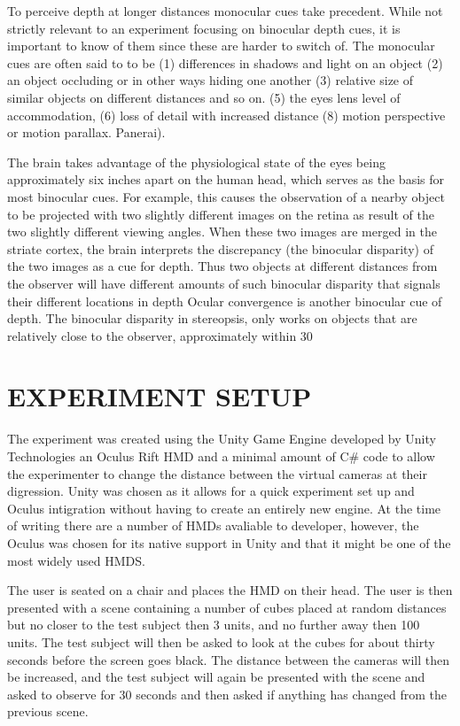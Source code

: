 \documentclass[tog]{acmsiggraph}
\begin{document}
To perceive depth at longer distances monocular cues take precedent. While not strictly relevant to an experiment focusing on binocular depth cues, it is important to know of them since these are harder to switch of. The monocular cues are often said to to be (1) differences in shadows and light on an object (2) an object occluding or in other ways hiding one another (3) relative size of similar objects on different distances and so on. (5) the eyes lens level of accommodation, (6) loss of detail with increased distance (8) motion perspective or motion parallax.
Panerai).

The brain takes advantage of the physiological state of the eyes being approximately six inches
apart on the human head, which serves as the basis for most binocular cues. For example, this
causes the observation of a nearby object to be projected with two slightly different images on the retina as result of the two slightly different viewing angles. When these two images are merged in the striate cortex, the brain interprets the discrepancy (the binocular disparity) of the two images as a cue for depth. Thus two objects at different distances from the observer will have different amounts of such binocular disparity that signals their different locations in depth 
Ocular convergence is another binocular cue of depth. The binocular disparity in stereopsis, only works on objects that are relatively close to the observer,
approximately within 30 



\section{EXPERIMENT SETUP}

The experiment was created using the Unity Game Engine developed by Unity Technologies an Oculus Rift HMD and a minimal amount of C\# code to allow the experimenter to change the distance between the virtual cameras at their digression. Unity was chosen as it allows for a quick experiment set up and Oculus intigration without having to create an entirely new engine.
At the time of writing there are a number of HMDs avaliable to developer, however, the Oculus was chosen for its native support in Unity and that it might be one of the most widely used HMDS.

The user is seated on a chair and places the HMD on their head. The user is then presented with a scene containing a number of cubes placed at random distances but no closer to the test subject then 3 units, and no further away then 100 units. The test subject will then be asked to look at the cubes for about thirty seconds before the screen goes black. The distance between the cameras will then be increased, and the test subject will again be presented with the scene and asked to observe for 30 seconds and then asked if anything has changed from the previous scene.  
\end{document}
